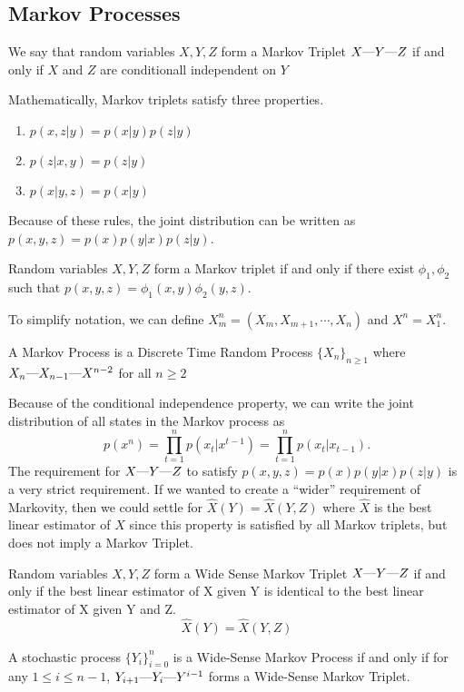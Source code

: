 \subsection{Markov Processes}
\begin{definition}
	We say that random variables $X, Y, Z$ form a Markov Triplet $X\text{\textemdash}Y\text{\textemdash}Z$ if and only if $X$ and $Z$ are conditionall independent on $Y$
	\label{defn:markov-triplet}
\end{definition}
Mathematically, Markov triplets satisfy three properties.
\begin{enumerate}
	\item $p(x, z | y) = p(x|y)p(z|y)$
	\item $p(z|x, y) = p(z|y)$
	\item $p(x|y, z) = p(x|y)$
\end{enumerate}
Because of these rules, the joint distribution can be written as $p(x, y, z) = p(x)p(y|x)p(z|y)$.
\begin{theorem}
	Random variables $X,Y,Z$ form a Markov triplet if and only if there exist $\phi_1, \phi_2$ such that $p(x, y, z) = \phi_1(x, y)\phi_2(y, z)$.
	\label{thm:markov-triplet}
\end{theorem}
To simplify notation, we can define $X_m^n = \left(X_m,X_{m+1},\cdots, X_n\right)$ and $X^n=X_1^n$.
\begin{definition}
	A Markov Process is a Discrete Time Random Process $\{X_n\}_{n\geq1}$ where $X_n\text{\textemdash}X_{n-1}\text{\textemdash}X^{n-2}$ for all $n\geq 2$
	\label{defn:markov-process}
\end{definition}
Because of the conditional independence property, we can write the joint distribution of all states in the Markov process as \[
	p(x^n) = \prod_{t=1}^n p(x_t|x^{t-1}) = \prod_{t=1}^np(x_t|x_{t-1}).
\]
The requirement for $X\text{\textemdash}Y\text{\textemdash}Z$ to satisfy $p(x, y, z) = p(x)p(y|x)p(z|y)$ is a very strict requirement.
If we wanted to create a ``wider'' requirement of Markovity, then we could settle for $\hat{X}(Y) = \hat{X}(Y, Z)$ where $\hat{X}$ is the best linear estimator of $X$ since this property is satisfied by all Markov triplets, but does not imply a Markov Triplet.
\begin{definition}
	Random variables $X, Y, Z$ form a Wide Sense Markov Triplet $X\text{\textemdash}Y\text{\textemdash}Z$ if and only if the best linear estimator of X given Y is identical to the best linear estimator of X given Y and Z.
	\[
		\hat{X}(Y) = \hat{X}(Y, Z)
	\]
	\label{defn:wss-markov-triplet}
\end{definition}
\begin{definition}
	A stochastic process $\{Y_i\}_{i=0}^n$ is a Wide-Sense Markov Process if and only if for any $1 \leq i \leq n - 1$, $Y_{i+1}\text{\textemdash}Y_i\text{\textemdash}Y^{i-1}$ forms a Wide-Sense Markov Triplet.
	\label{defn:ws-markov}
\end{definition}
